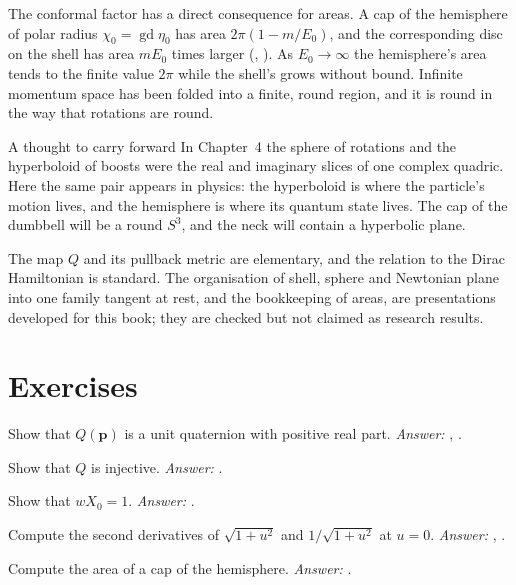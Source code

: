 The conformal factor has a direct consequence for areas. A cap of the hemisphere of polar radius $\chi_0=\operatorname{gd}\eta_0$ has area $2\pi(1-m/E_0)$, and the corresponding disc on the shell has area $mE_0$ times larger (, ). As $E_0\to\infty$ the hemisphere's area tends to the finite value $2\pi$ while the shell's grows without bound. Infinite momentum space has been folded into a finite, round region, and it is round in the way that rotations are round.

\begin{asidebox}{A thought to carry forward}
In Chapter~4 the sphere of rotations and the hyperboloid of boosts were the real and imaginary slices of one complex quadric. Here the same pair appears in physics: the hyperboloid is where the particle's motion lives, and the hemisphere is where its quantum state lives. The cap of the dumbbell will be a round $S^3$, and the neck will contain a hyperbolic plane.
\end{asidebox}

\begin{standsbox}
The map $Q$ and its pullback metric are elementary, and the relation to the Dirac Hamiltonian is standard. The organisation of shell, sphere and Newtonian plane into one family tangent at rest, and the bookkeeping of areas, are presentations developed for this book; they are checked but not claimed as research results.
\end{standsbox}

\section*{Exercises}
\begin{exercise}Show that $Q(\mathbf p)$ is a unit quaternion with positive real part. \emph{Answer:} , .\end{exercise}
\begin{exercise}Show that $Q$ is injective. \emph{Answer:} .\end{exercise}
\begin{exercise}Show that $wX_0=1$. \emph{Answer:} .\end{exercise}
\begin{exercise}Compute the second derivatives of $\sqrt{1+u^2}$ and $1/\sqrt{1+u^2}$ at $u=0$. \emph{Answer:} , .\end{exercise}
\begin{exercise}Compute the area of a cap of the hemisphere. \emph{Answer:} .\end{exercise}

